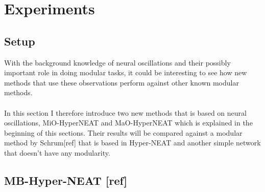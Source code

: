 \documentclass[11pt, a4paper]{article}
\begin{document}
\author{Mads Anthony}
\section{Experiments}
\subsection{Setup}
With the background knowledge of neural oscillations and their possibly important role in doing modular tasks, it could be interesting to see how new methods that use these observations perform against other known modular methods.
\\
\\
In this section I therefore introduce two new methods that is based on neural oscillations, MiO-HyperNEAT and MaO-HyperNEAT which is explained in the beginning of this sections. Their results will be compared against a modular method by Schrum[ref] that is based in Hyper-NEAT and another simple network that doesn't have any modularity.
\subsection{MB-Hyper-NEAT [ref]}
\end{document}
